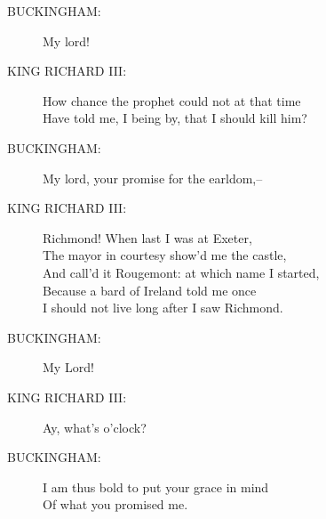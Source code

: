 \documentclass{article}
\begin{document}
\begin{description}
\item[BUCKINGHAM:] 
\hspace{1pt}My lord!\\
\end{description}
\begin{description}
\item[KING RICHARD III:] 
\hspace{1pt}How chance the prophet could not at that time\\
\hspace{1pt}Have told me, I being by, that I should kill him?\\
\end{description}
\begin{description}
\item[BUCKINGHAM:] 
\hspace{1pt}My lord, your promise for the earldom,--\\
\end{description}
\begin{description}
\item[KING RICHARD III:] 
\hspace{1pt}Richmond! When last I was at Exeter,\\
\hspace{1pt}The mayor in courtesy show'd me the castle,\\
\hspace{1pt}And call'd it Rougemont: at which name I started,\\
\hspace{1pt}Because a bard of Ireland told me once\\
\hspace{1pt}I should not live long after I saw Richmond.\\
\end{description}
\begin{description}
\item[BUCKINGHAM:] 
\hspace{1pt}My Lord!\\
\end{description}
\begin{description}
\item[KING RICHARD III:] 
\hspace{1pt}Ay, what's o'clock?\\
\end{description}
\begin{description}
\item[BUCKINGHAM:] 
\hspace{1pt}I am thus bold to put your grace in mind\\
\hspace{1pt}Of what you promised me.\\
\end{description}
\end{document}
